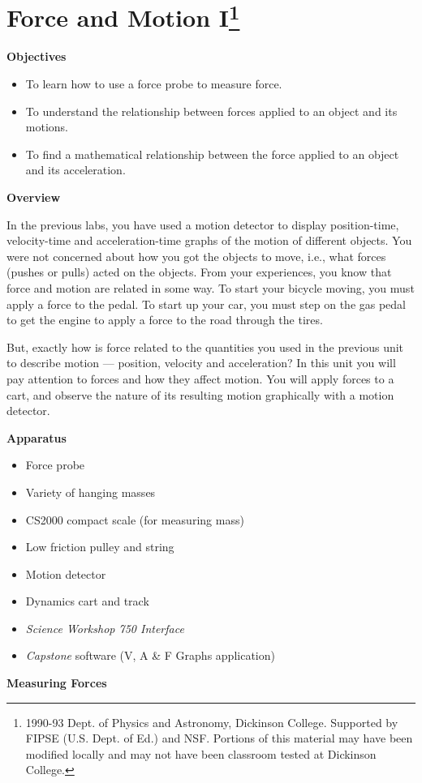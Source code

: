 
\section{Force and Motion I\footnote{
1990-93 Dept. of Physics and Astronomy, Dickinson College. Supported by FIPSE
(U.S. Dept. of Ed.) and NSF. Portions of this material may have been modified
locally and may not have been classroom tested at Dickinson College.
}}

\makelabheader %

\textbf{Objectives }

\begin{itemize}
\item To learn how to use a force probe to measure force. 
\item To understand the relationship between forces applied to an object and its motions. 
\item To find a mathematical relationship between the force applied to an object and its acceleration.
\end{itemize}
\textbf{Overview }

In the previous labs, you have used a motion detector to display position-time,
velocity-time and acceleration-time graphs of the motion of different objects.
You were not concerned about how you got the objects to move, i.e., what forces
(pushes or pulls) acted on the objects. From your experiences, you know that
force and motion are related in some way. To start your bicycle moving, you
must apply a force to the pedal. To start up your car, you must step on the
gas pedal to get the engine to apply a force to the road through the tires.

But, exactly how is force related to the quantities you used in the previous
unit to describe motion --- position, velocity and acceleration? In this unit you
will pay attention to forces and how they affect motion. You will apply forces
to a cart, and observe the nature of its resulting motion graphically with a
motion detector.

\textbf{Apparatus} 

\begin{itemize}
\item Force probe 
\item Variety of hanging masses 
\item CS2000 compact scale (for measuring mass)
\item Low friction pulley and string 
\item Motion detector 
\item Dynamics cart and track 
\item \textit{Science Workshop 750 Interface}
\item \textit{Capstone} software (V, A \& F Graphs application)
\end{itemize}
\textbf{Measuring Forces} 

